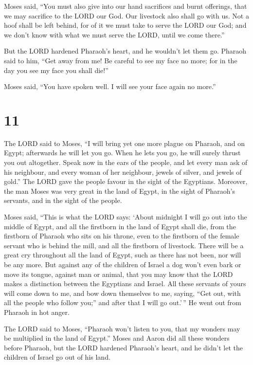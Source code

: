  Moses said, ``You must also give into our hand
sacrifices and burnt offerings, that we may sacrifice to the LORD our
God.  Our livestock also shall go with us. Not a hoof
shall be left behind, for of it we must take to serve the LORD our God;
and we don't know with what we must serve the LORD, until we come
there.''

 But the LORD hardened Pharaoh's heart, and he wouldn't
let them go.  Pharaoh said to him, ``Get away from me! Be
careful to see my face no more; for in the day you see my face you shall
die!''

 Moses said, ``You have spoken well. I will see your face
again no more.''

\hypertarget{section-10}{%
\section{11}\label{section-10}}

 The LORD said to Moses, ``I will bring yet one more
plague on Pharaoh, and on Egypt; afterwards he will let you go. When he
lets you go, he will surely thrust you out altogether. 
Speak now in the ears of the people, and let every man ask of his
neighbour, and every woman of her neighbour, jewels of silver, and
jewels of gold.''  The LORD gave the people favour in the
sight of the Egyptians. Moreover, the man Moses was very great in the
land of Egypt, in the sight of Pharaoh's servants, and in the sight of
the people.

 Moses said, ``This is what the LORD says: `About midnight
I will go out into the middle of Egypt,  and all the
firstborn in the land of Egypt shall die, from the firstborn of Pharaoh
who sits on his throne, even to the firstborn of the female servant who
is behind the mill, and all the firstborn of livestock. 
There will be a great cry throughout all the land of Egypt, such as
there has not been, nor will be any more.  But against any
of the children of Israel a dog won't even bark or move its tongue,
against man or animal, that you may know that the LORD makes a
distinction between the Egyptians and Israel.  All these
servants of yours will come down to me, and bow down themselves to me,
saying, ``Get out, with all the people who follow you;'' and after that
I will go out.'\,'' He went out from Pharaoh in hot anger.

 The LORD said to Moses, ``Pharaoh won't listen to you,
that my wonders may be multiplied in the land of Egypt.''
 Moses and Aaron did all these wonders before Pharaoh,
but the LORD hardened Pharaoh's heart, and he didn't let the children of
Israel go out of his land.

